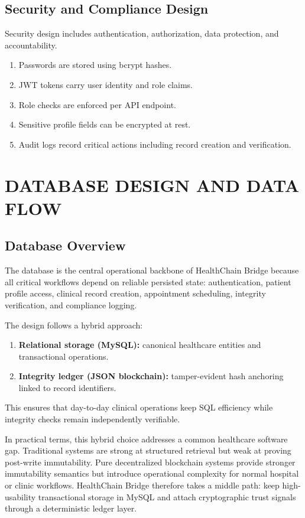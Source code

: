 \documentclass[12pt,a4paper]{report}
\begin{document}
\section{Security and Compliance Design}

Security design includes authentication, authorization, data protection, and accountability.

\begin{enumerate}
\item Passwords are stored using bcrypt hashes.
\item JWT tokens carry user identity and role claims.
\item Role checks are enforced per API endpoint.
\item Sensitive profile fields can be encrypted at rest.
\item Audit logs record critical actions including record creation and verification.
\end{enumerate}

\chapter{DATABASE DESIGN AND DATA FLOW}

\section{Database Overview}

The database is the central operational backbone of HealthChain Bridge because all critical workflows depend on reliable persisted state: authentication, patient profile access, clinical record creation, appointment scheduling, integrity verification, and compliance logging.

The design follows a hybrid approach:

\begin{enumerate}
\item \textbf{Relational storage (MySQL):} canonical healthcare entities and transactional operations.
\item \textbf{Integrity ledger (JSON blockchain):} tamper-evident hash anchoring linked to record identifiers.
\end{enumerate}

This ensures that day-to-day clinical operations keep SQL efficiency while integrity checks remain independently verifiable.

In practical terms, this hybrid choice addresses a common healthcare software gap. Traditional systems are strong at structured retrieval but weak at proving post-write immutability. Pure decentralized blockchain systems provide stronger immutability semantics but introduce operational complexity for normal hospital or clinic workflows. HealthChain Bridge therefore takes a middle path: keep high-usability transactional storage in MySQL and attach cryptographic trust signals through a deterministic ledger layer.
\end{document}
